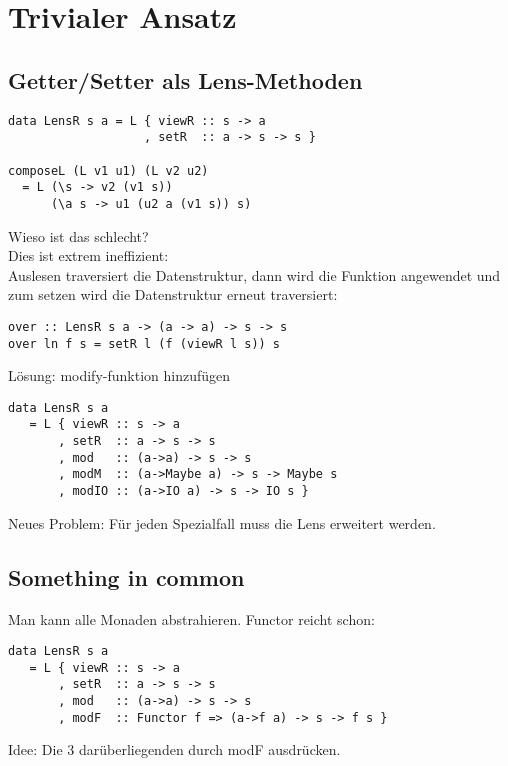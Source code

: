 \documentclass{beamer}
\begin{document}
\section{Trivialer Ansatz}

\subsection{Getter/Setter als Lens-Methoden}
\begin{frame}[fragile]
\begin{verbatim}
data LensR s a = L { viewR :: s -> a
                   , setR  :: a -> s -> s }

composeL (L v1 u1) (L v2 u2)
  = L (\s -> v2 (v1 s))
      (\a s -> u1 (u2 a (v1 s)) s)
\end{verbatim}
\end{frame}

\begin{frame}[fragile]
Wieso ist das schlecht?\\
\pause
\bigskip
Dies ist extrem ineffizient:\\
Auslesen traversiert die Datenstruktur, dann wird die Funktion
angewendet und zum setzen wird die Datenstruktur erneut traversiert:

\begin{verbatim}
over :: LensR s a -> (a -> a) -> s -> s
over ln f s = setR l (f (viewR l s)) s
\end{verbatim}
\pause
Lösung: modify-funktion hinzufügen

\end{frame}

\begin{frame}[fragile]
\begin{verbatim}
data LensR s a
   = L { viewR :: s -> a
       , setR  :: a -> s -> s
       , mod   :: (a->a) -> s -> s
       , modM  :: (a->Maybe a) -> s -> Maybe s
       , modIO :: (a->IO a) -> s -> IO s }
\end{verbatim}
\pause
Neues Problem: Für jeden Spezialfall muss die Lens erweitert werden.
\end{frame}

\subsection{Something in common}
\begin{frame}[fragile]
Man kann alle Monaden abstrahieren. Functor reicht schon:

\begin{verbatim}
data LensR s a
   = L { viewR :: s -> a
       , setR  :: a -> s -> s
       , mod   :: (a->a) -> s -> s
       , modF  :: Functor f => (a->f a) -> s -> f s }
\end{verbatim}
\pause

Idee: Die 3 darüberliegenden durch modF ausdrücken.
\end{frame}
\end{document}
